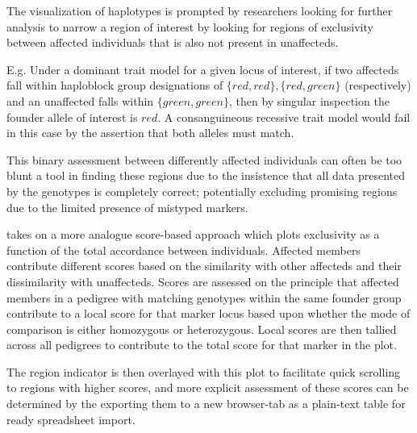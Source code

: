 The visualization of haplotypes is prompted by researchers looking for further analysis to narrow a region of interest by looking for regions of exclusivity between affected individuals that is also not present in unaffecteds.

  E.g. Under a dominant trait model for a given locus of interest, if two affecteds fall within haploblock group designations of  $\{red,red\}, \{red,green\}$ (respectively) and an unaffected falls within $\{green,green\}$, then by singular inspection the founder allele of interest is $red$. A consanguineous recessive trait model would fail in this case by the assertion that both alleles must match.

This binary assessment between differently affected individuals can often be too blunt a tool in finding these regions due to the insistence that all data presented by the genotypes is completely correct; potentially excluding promising regions due to the limited presence of mistyped markers. 

\haplo takes on a more analogue score-based approach which plots exclusivity as a function of the total accordance between individuals. Affected members contribute different scores based on the similarity with other affecteds and their dissimilarity with unaffecteds. Scores are assessed on the principle that affected members in a pedigree with matching genotypes within the same founder group contribute to a local score for that marker locus based upon whether the mode of comparison is either homozygous or heterozygous. Local scores are then tallied across all pedigrees to contribute to the total score for that marker in the plot.


The region indicator is then overlayed with this plot to facilitate quick scrolling to regions with higher scores, and more explicit assessment of these scores can be determined by the exporting them to a new browser-tab as a plain-text table for ready spreadsheet import.


